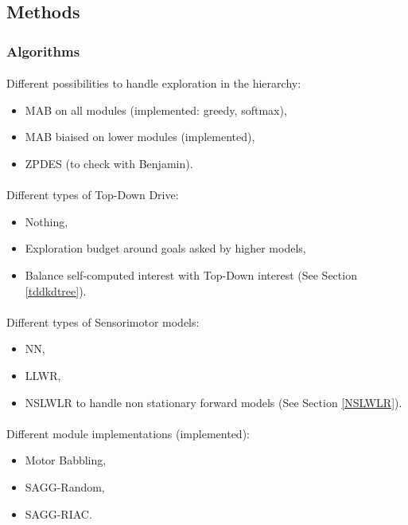 \documentclass[12pt]{article}
\begin{document}
	
	\subsection{Methods}
		
		\subsubsection{Algorithms}
		
			\paragraph{}
			Different possibilities to handle exploration in the hierarchy:
			\begin{itemize}
				\item MAB on all modules (implemented: greedy, softmax),
				\item MAB biaised on lower modules (implemented),
				\item ZPDES (to check with Benjamin).
			\end{itemize}
			
			\paragraph{}
			Different types of Top-Down Drive:
			\begin{itemize}
				\item Nothing,
				\item Exploration budget around goals asked by higher models,
				\item Balance self-computed interest with Top-Down interest (See Section \ref{tddkdtree}).
			\end{itemize}
			
			
			\paragraph{}
			Different types of Sensorimotor models:
			\begin{itemize}
				\item NN,
				\item LLWR,
				\item NSLWLR to handle non stationary forward models (See Section \ref{NSLWLR}).
			\end{itemize}
			
			\paragraph{}
			Different module implementations (implemented):
			\begin{itemize}
				\item Motor Babbling,
				\item SAGG-Random,
				\item SAGG-RIAC.
			\end{itemize}
		
\end{document}
